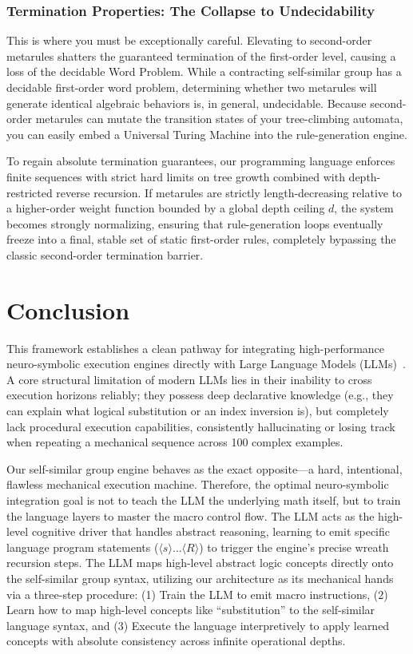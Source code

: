 \documentclass[twocolumn]{article}
\begin{document}
\subsubsection{Termination Properties: The Collapse to Undecidability}
This is where you must be exceptionally careful. Elevating to second-order metarules shatters the guaranteed termination of the first-order level, causing a loss of the decidable Word Problem. While a contracting self-similar group has a decidable first-order word problem, determining whether two metarules will generate identical algebraic behaviors is, in general, undecidable. Because second-order metarules can mutate the transition states of your tree-climbing automata, you can easily embed a Universal Turing Machine into the rule-generation engine. 

To regain absolute termination guarantees, our programming language enforces finite sequences with strict hard limits on tree growth combined with depth-restricted reverse recursion. If metarules are strictly length-decreasing relative to a higher-order weight function bounded by a global depth ceiling $d$, the system becomes strongly normalizing, ensuring that rule-generation loops eventually freeze into a final, stable set of static first-order rules, completely bypassing the classic second-order termination barrier.

\section{Conclusion}
This framework establishes a clean pathway for integrating high-performance neuro-symbolic execution engines directly with Large Language Models (LLMs)~\cite{neural_symbolic2023}. A core structural limitation of modern LLMs lies in their inability to cross execution horizons reliably; they possess deep declarative knowledge (e.g., they can explain what logical substitution or an index inversion is), but completely lack procedural execution capabilities, consistently hallucinating or losing track when repeating a mechanical sequence across 100 complex examples.

Our self-similar group engine behaves as the exact opposite—a hard, intentional, flawless mechanical execution machine. Therefore, the optimal neuro-symbolic integration goal is not to teach the LLM the underlying math itself, but to train the language layers to master the macro control flow. The LLM acts as the high-level cognitive driver that handles abstract reasoning, learning to emit specific language program statements ($\langle s \rangle \dots \langle R \rangle$) to trigger the engine's precise wreath recursion steps. The LLM maps high-level abstract logic concepts directly onto the self-similar group syntax, utilizing our architecture as its mechanical hands via a three-step procedure: (1) Train the LLM to emit macro instructions, (2) Learn how to map high-level concepts like ``substitution'' to the self-similar language syntax, and (3) Execute the language interpretively to apply learned concepts with absolute consistency across infinite operational depths.
\end{document}
